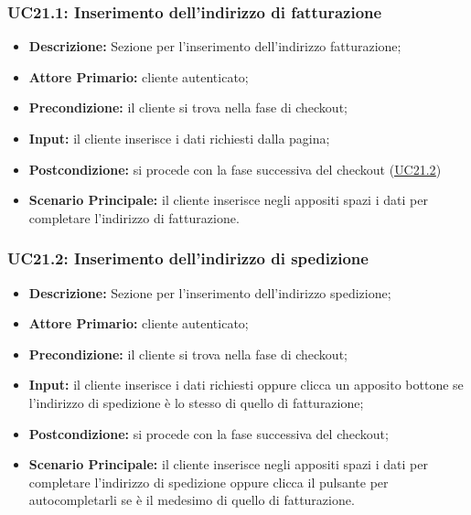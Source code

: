 \subsubsection{UC21.1: Inserimento dell'indirizzo di fatturazione}
\label{sec:UC21.1}
\begin{itemize}
    \item \textbf{Descrizione:} Sezione per l'inserimento dell'indirizzo fatturazione;
    \item \textbf{Attore Primario:} cliente autenticato;
    \item \textbf{Precondizione:} il cliente si trova nella fase di checkout;
    \item \textbf{Input:} il cliente inserisce i dati richiesti dalla pagina;
    \item \textbf{Postcondizione:} si procede con la fase successiva del checkout (\hyperref[sec:UC21.2]{\underline{UC21.2}})
    \item \textbf{Scenario Principale:} il cliente inserisce negli appositi spazi i dati per completare l'indirizzo di fatturazione.
\end{itemize}
\subsubsection{UC21.2: Inserimento dell'indirizzo di spedizione}
\label{sec:UC21.2}
\begin{itemize}
    \item \textbf{Descrizione:} Sezione per l'inserimento dell'indirizzo spedizione;
    \item \textbf{Attore Primario:} cliente autenticato;
    \item \textbf{Precondizione:} il cliente si trova nella fase di checkout;
    \item \textbf{Input:} il cliente inserisce i dati richiesti oppure clicca un apposito bottone se l'indirizzo di spedizione è lo stesso di quello di fatturazione;
    \item \textbf{Postcondizione:} si procede con la fase successiva del checkout;
    \item \textbf{Scenario Principale:} il cliente inserisce negli appositi spazi i dati per completare l'indirizzo di spedizione oppure clicca il pulsante per autocompletarli se è il medesimo di quello di fatturazione.
\end{itemize}
